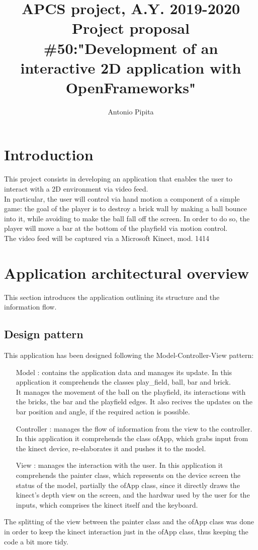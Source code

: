 \documentclass[]{article}
\title{APCS project, A.Y. 2019-2020\\Project proposal \#50:"Development of an interactive 2D application with  OpenFrameworks"}
\author{Antonio Pipita}
\begin{document}
\maketitle
\newpage
\tableofcontents
\newpage
\section{Introduction}
This project consists in developing an application that enables the user to interact with a 2D environment via video feed.\\
In particular, the user will control via hand motion a component of a simple game: the goal of the player is to destroy a brick wall by making a ball bounce into it, while avoiding to make the ball fall off the screen. In order to do so, the player will move a bar at the bottom of the playfield via motion control.\\
The video feed will be captured via a Microsoft Kinect, mod. 1414\\
\section{Application architectural overview}
This section introduces the application outlining its structure and the information flow.
\subsection{Design pattern}
This application has been designed following the Model-Controller-View pattern:
\begin{itemize}
	\item [Model]: contains the application data and manages its update. In this application it comprehends the classes play\_field, ball, bar and brick.\\
				It manages the movement of the ball on the playfield, its interactions with the bricks, the bar and the playfield edges. It also recives the updates on the bar position and angle, if the required action is possible. 
	\item [Controller]: manages the flow of information from the view to the controller. In this application it comprehends the class ofApp, which grabs input from the kinect device, re-elaborates it and pushes it to the model.
	\item [View]: manages the interaction with the user. In this application it comprehends the painter class, which represents on the device screen the status of the model, partially the ofApp class, since it directly draws the kinect's depth view on the screen, and the hardwar used by the user for the inputs, which comprises the kinect itself and the keyboard. 
\end{itemize}
The splitting of the view between the painter class and the ofApp class was done in order to keep the kinect interaction just in the ofApp class, thus keeping the code a bit more tidy.
\end{document}
